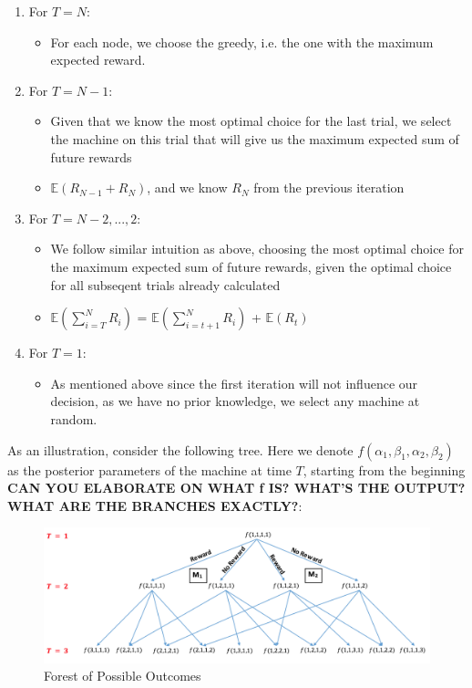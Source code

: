 \documentclass{article}
\begin{document}
\begin{enumerate}
\item For $T = N$:
	\begin{itemize}
	\item For each node, we choose the greedy, i.e. the one with the maximum expected reward.
	\end{itemize}
\item For $T = N-1$:
	\begin{itemize}
	\item Given that we know the most optimal choice for the last trial, we select the machine on this trial that will give us the maximum expected sum of future rewards
	\item $\mathbb{E}(R_{N-1} + R_{N})$, and we know $R_N$ from the previous iteration
	\end{itemize}
\item For $T = N-2,..., 2$:
	\begin{itemize}
	\item We follow similar intuition as above, choosing the most optimal choice for the maximum expected sum of future rewards, given the optimal choice for all subseqent trials already calculated
	\item $\mathbb{E}(\displaystyle\sum_{i=T}^{N} R_i)$ = $\mathbb{E}(\displaystyle\sum_{i=t+1}^{N} R_i)$ + $\mathbb{E}(R_t)$
	\end{itemize}
\item For $T = 1$:
	\begin{itemize}
	\item As mentioned above since the first iteration will not influence our decision, as we have no prior knowledge, we select any machine at random.
	\end{itemize}
\end{enumerate}

As an illustration, consider the following tree. Here we denote $f(\alpha_1, \beta_1, \alpha_2, \beta_2)$ as the posterior parameters of the machine at time $T$, starting from the beginning \textbf{CAN YOU ELABORATE ON WHAT f IS? WHAT'S THE OUTPUT? WHAT ARE THE BRANCHES EXACTLY?}:

\begin{figure}[H]
\centering
\includegraphics[scale=0.75]{Dynamic_Programming_Tree.png}
\caption{Forest of Possible Outcomes}
\end{figure}
\end{document}
